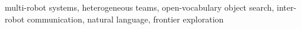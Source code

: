 multi-robot systems, heterogeneous teams, open-vocabulary object search, inter-robot communication, natural language, frontier exploration
